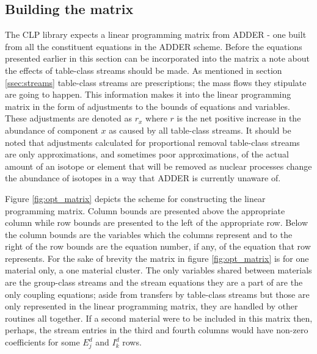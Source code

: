 \documentclass[]{elsarticle}
\begin{document}
\subsection{Building the matrix}
The CLP library expects a linear programming matrix from ADDER - one built from
all the constituent equations in the ADDER scheme. Before the equations 
presented earlier in this section can be incorporated into the matrix a note
about the effects of table-class streams should be made. As mentioned in section
\ref{ssec:streams} table-class streams are prescriptions; the mass flows they
stipulate are going to happen. This information makes it into the linear
programming matrix in the form of adjustments to the bounds of equations
and variables. These adjustments are denoted
as $r_{x}$ where $r$ is the net positive increase in the abundance of
component $x$ as caused by all table-class streams. It should be noted that
adjustments calculated for proportional removal table-class streams are only
approximations, and sometimes poor approximations, of the actual amount of an
isotope or element that will be removed as nuclear processes change the 
abundance of isotopes in a way that ADDER is currently unaware of.

Figure \ref{fig:opt_matrix}
depicts the scheme for constructing the linear programming matrix. Column bounds
are presented above the appropriate column while row bounds are presented to the
left of the appropriate row. Below the column bounds are the variables which
the columns represent and to the right of the row bounds are the equation
number, if any, of the equation that row represents. For the sake of brevity
the matrix in figure \ref{fig:opt_matrix} is for one material only, a one 
material cluster. The only variables shared between materials are the
group-class streams and the stream equations they are a part of are the only
coupling equations; aside from transfers by table-class streams but those
are only represented in the linear programming matrix, they are handled by
other routines all together. If a second material were to be included in this
matrix then, perhaps, the stream entries in the third and fourth columns would
have non-zero coefficients for some $E_{j}^{d}$ and $I_{k}^{d}$ rows.
\end{document}
